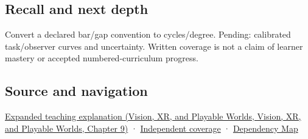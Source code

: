 \subsection{Recall and next depth}\label{appendix-b491fc48c54b-recall-and-next-depth}

Convert a declared bar/gap convention to cycles/degree. Pending: calibrated task/observer curves and uncertainty. Written coverage is not a claim of learner mastery or accepted numbered-curriculum progress.

\subsection{Source and navigation}\label{appendix-b491fc48c54b-source-and-navigation}

\href{../07-Vision-XR-and-Playable-Worlds/main.pdf\#nameddest=04-visual-computing-ii-ch042-visibility-is-about-contrast-conditions-and-tasks}{Expanded teaching explanation (Vision, XR, and Playable Worlds, Vision, XR, and Playable Worlds, Chapter 9)} · \hyperref[appendix-fd090d982a15-xr01---independent-seeing-and-representation-source]{Independent coverage} · \hyperref[appendix-4ad47bdd269a]{Dependency Map}
